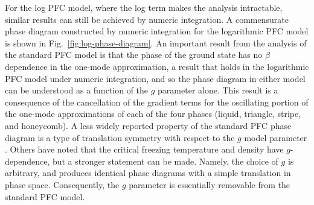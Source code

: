 For the log PFC model, where the log term makes the analysis intractable, similar results can still be achieved by numeric integration.  A commensurate phase diagram constructed by numeric integration for the logarithmic PFC model is shown in Fig.~\ref{fig:log-phase-diagram}.  An important result from the analysis of the standard PFC model is that the phase of the ground state has no $\beta$ dependence in the one-mode approximation, a result that holds in the logarithmic PFC model under numeric integration, and so the phase diagram in either model can be understood as a function of the $g$ parameter alone.  This result is a consequence of the cancellation of the gradient terms for the oscillating portion of the one-mode approximations of each of the four phases (liquid, triangle, stripe, and honeycomb).  A less widely reported property of the standard PFC phase diagram is a type of translation symmetry with respect to the $g$ model parameter \cite{oettel2012description-318}.  Others have noted that the critical freezing temperature and density have $g$-dependence, but a stronger statement can be made.  Namely, the choice of $g$ is arbitrary, and produces identical phase diagrams with a simple translation in phase space.  Consequently, the $g$ parameter is essentially removable from the standard PFC model.

